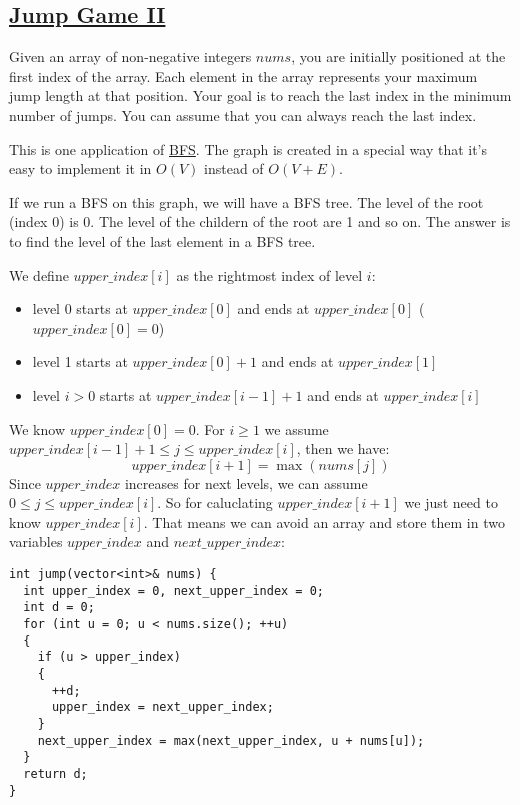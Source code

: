 \documentclass{book}
\begin{document}
	\subsection{\href{https://leetcode.com/problems/jump-game-ii/}{Jump Game II}}
	\label{subsec:jump_game_ii}
	Given an array of non-negative integers $nums$, you are initially positioned at the first index of the array. Each element in the array represents your maximum jump length at that position. Your goal is to reach the last index in the minimum number of jumps. You can assume that you can always reach the last index.
	\par This is one application of \href{https://en.wikipedia.org/wiki/Breadth-first_search}{BFS}. The graph is created in a special way that it's easy to implement it in $O(V)$ instead of $O(V + E)$.
	\par If we run a BFS on this graph, we will have a BFS tree. The level of the root (index 0) is 0. The level of the childern of the root are 1 and so on. The answer is to find the level of the last element in a BFS tree.
	\par We define $upper\_index[i]$ as the rightmost index of level $i$:
	\begin{itemize}
		\item level 0 starts at $upper\_index[0]$ and ends at $upper\_index[0]$ ($upper\_index[0] = 0$)
		\item level 1 starts at $upper\_index[0] + 1$ and ends at $upper\_index[1]$
		\item level $i > 0$ starts at $upper\_index[i - 1] + 1$ and ends at $upper\_index[i]$
	\end{itemize}
	We know $upper\_index[0] = 0$. For $i \ge 1$ we assume $upper\_index[i - 1] + 1 \le j \le upper\_index[i]$, then we have:
	\begin{equation*}
		upper\_index[i + 1] = \max{(nums[j])}
	\end{equation*}
	Since $upper\_index$ increases for next levels, we can assume $0 \le j \le upper\_index[i]$. So for caluclating $upper\_index[i + 1]$ we just need to know $upper\_index[i]$. That means we can avoid an array and store them in two variables $upper\_index$ and $next\_upper\_index$:
	\begin{lstlisting}
int jump(vector<int>& nums) {
  int upper_index = 0, next_upper_index = 0;
  int d = 0;
  for (int u = 0; u < nums.size(); ++u)
  {
    if (u > upper_index)
    {
      ++d;
      upper_index = next_upper_index;
    }            
    next_upper_index = max(next_upper_index, u + nums[u]);
  }
  return d;
}
	\end{lstlisting}
\end{document}
